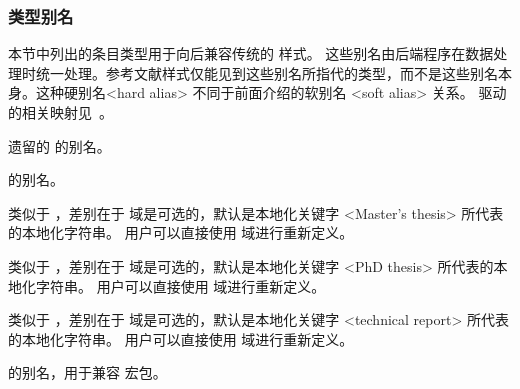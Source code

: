 \subsubsection{类型别名}
\label{bib:typ:als}


本节中列出的条目类型用于向后兼容传统的 \BibTeX 样式。
这些别名由后端程序在数据处理时统一处理。参考文献样式仅能见到这些别名所指代的类型，而不是这些别名本身。这种硬别名<hard alias> 不同于前面介绍的软别名 <soft alias> 关系。
驱动的相关映射见~。


\begin{typelist}

\BibTeX 遗留的  的别名。

的别名。

类似于 ，差别在于  域是可选的，默认是本地化关键字 <Master's thesis> 所代表的本地化字符串。
用户可以直接使用  域进行重新定义。

类似于  ，差别在于  域是可选的，默认是本地化关键字 <PhD thesis> 所代表的本地化字符串。
用户可以直接使用  域进行重新定义。

类似于 ，差别在于  域是可选的，默认是本地化关键字 <technical report> 所代表的本地化字符串。
用户可以直接使用  域进行重新定义。

 的别名，用于兼容  宏包。

\end{typelist}


